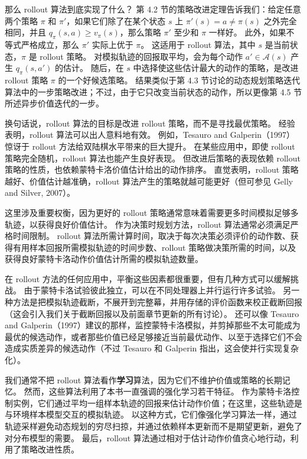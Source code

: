 \documentclass[UTF8,12pt,a4paper,fontset=fandol]{ctexart}
\begin{document}
那么 rollout 算法到底实现了什么？
第 4.2 节的策略改进定理告诉我们：给定任意两个策略 $\pi$ 和 $\pi'$，如果它们除了在某个状态 $s$ 上 $\pi'(s)=a\ne\pi(s)$ 之外完全相同，并且 $q_\pi(s,a)\ge v_\pi(s)$，那么策略 $\pi'$ 至少和 $\pi$ 一样好。
此外，如果不等式严格成立，那么 $\pi'$ 实际上优于 $\pi$。
这适用于 rollout 算法，其中 $s$ 是当前状态，$\pi$ 是 rollout 策略。
对模拟轨迹的回报取平均，会为每个动作 $a'\in\mathcal{A}(s)$ 产生 $q_\pi(s,a')$ 的估计。
随后，在 $s$ 中选择使这些估计最大的动作的策略，是改进 rollout 策略 $\pi$ 的一个好候选策略。
结果类似于第 4.3 节讨论的动态规划策略迭代算法中的一步策略改进；不过，由于它只改变当前状态的动作，所以更像第 4.5 节所述异步价值迭代的一步。

换句话说，rollout 算法的目标是改进 rollout 策略，而不是寻找最优策略。
经验表明，rollout 算法可以出人意料地有效。
例如，Tesauro and Galperin（1997）惊讶于 rollout 方法给双陆棋水平带来的巨大提升。
在某些应用中，即使 rollout 策略完全随机，rollout 算法也能产生良好表现。
但改进后策略的表现依赖 rollout 策略的性质，也依赖蒙特卡洛价值估计给出的动作排序。
直觉表明，rollout 策略越好、价值估计越准确，rollout 算法产生的策略就越可能更好（但可参见 Gelly and Silver, 2007）。

这里涉及重要权衡，因为更好的 rollout 策略通常意味着需要更多时间模拟足够多轨迹，以获得良好价值估计。
作为决策时规划方法，rollout 算法通常必须满足严格时间限制。
rollout 算法所需计算时间，取决于每次决策必须评价的动作数、获得有用样本回报所需模拟轨迹的时间步数、rollout 策略做决策所需的时间，以及获得良好蒙特卡洛动作价值估计所需的模拟轨迹数量。

在 rollout 方法的任何应用中，平衡这些因素都很重要，但有几种方式可以缓解挑战。
由于蒙特卡洛试验彼此独立，可以在不同处理器上并行运行许多试验。
另一种方法是把模拟轨迹截断，不展开到完整幕，并用存储的评价函数来校正截断回报（这会引入我们关于截断回报以及前面章节更新的所有讨论）。
还可以像 Tesauro and Galperin（1997）建议的那样，监控蒙特卡洛模拟，并剪掉那些不太可能成为最优的候选动作，或者那些价值已经足够接近当前最优动作、以至于选择它们不会造成实质差异的候选动作（不过 Tesauro 和 Galperin 指出，这会使并行实现复杂化）。

我们通常不把 rollout 算法看作\textbf{学习}算法，因为它们不维护价值或策略的长期记忆。
然而，这些算法利用了本书一直强调的强化学习若干特征。
作为蒙特卡洛控制实例，它们通过平均一组样本轨迹的回报来估计动作价值；在这里，这些轨迹是与环境样本模型交互的模拟轨迹。
以这种方式，它们像强化学习算法一样，通过轨迹采样避免动态规划的穷尽扫掠，并通过依赖样本更新而不是期望更新，避免了对分布模型的需要。
最后，rollout 算法通过相对于估计动作价值贪心地行动，利用了策略改进性质。
\end{document}

